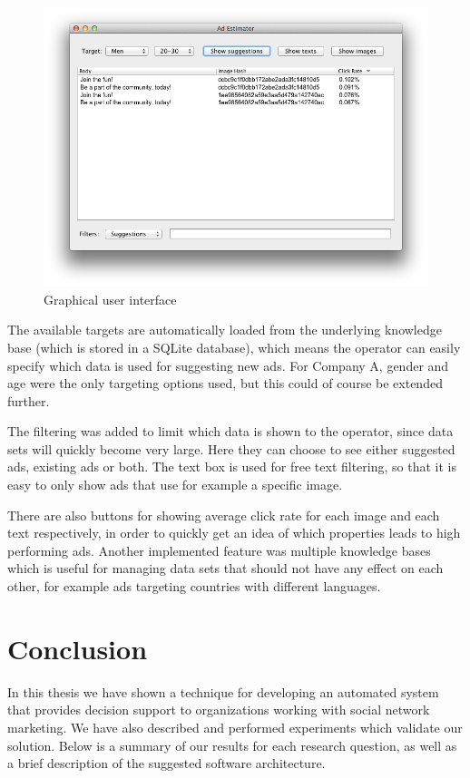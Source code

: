 \documentclass{sig-alternate}
\begin{document}
\begin{figure}[htb]
    \centering
    \includegraphics[width=\columnwidth]{gui-screenshot-mock-data.png}
    \caption{Graphical user interface}
    \label{fig:GUI}
\end{figure}

The available targets are automatically loaded from the underlying knowledge base (which is stored in a SQLite database), which means the operator can easily specify which data is used for suggesting new ads. For Company A, gender and age were the only targeting options used, but this could of course be extended further.

The filtering was added to limit which data is shown to the operator, since data sets will quickly become very large. Here they can choose to see either suggested ads, existing ads or both. The text box is used for free text filtering, so that it is easy to only show ads that use for example a specific image.

There are also buttons for showing average click rate for each image and each text respectively, in order to quickly get an idea of which properties leads to high performing ads. Another implemented feature was multiple knowledge bases which is useful for managing data sets that should not have any effect on each other, for example ads targeting countries with different languages.

\newpage
\section{Conclusion}
\label{ch:Conclusion}
In this thesis we have shown a technique for developing an automated system that provides decision support to organizations working with social network marketing. We have also described and performed experiments which validate our solution. Below is a summary of our results for each research question, as well as a brief description of the suggested software architecture.
\end{document}
